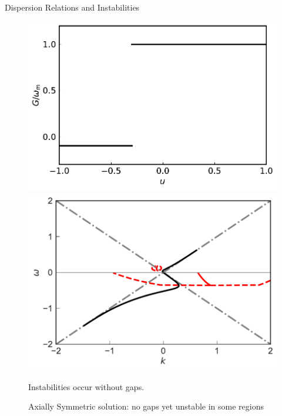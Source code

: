\begin{frame}{Dispersion Relations and Instabilities}



   \begin{figure}
      \includegraphics[width=\linewidth]{assets/dr/boxSpectPlt}
      \caption*{Box spectrum: $-0.1$ for $u\in [-1,-0.3)$; $1$ for $u\in [-0.3,1]$}
      \endminipage\hfill
      \includegraphics[width=\linewidth]{assets/dr/spectBoxC1MZADRPltBlob.pdf}
      \caption*{Axially Symmetric solution: no gaps yet unstable in some regions}
      \endminipage\hfill
    \pause
    \begin{tcolorbox}
      \centering
      Instabilities occur without gaps.
    \end{tcolorbox}
   \end{figure}



\end{frame}
